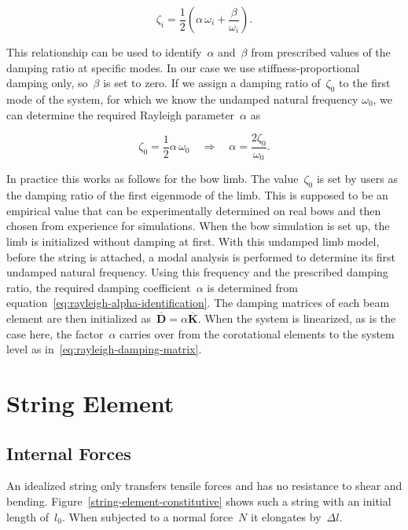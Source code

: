\begin{equation}
\zeta_{i} = \frac{1}{2}\left(\alpha\,\omega_{i} + \frac{\beta}{\omega_{i}}\right).
\end{equation}

This relationship can be used to identify~$\alpha$ and~$\beta$ from prescribed values of the damping ratio at specific modes.
In our case we use stiffness-proportional damping only, so~$\beta$ is set to zero.
If we assign a damping ratio of~$\zeta_{0}$ to the first mode of the system, for which we know the undamped natural frequency $\omega_0$, we can determine the required Rayleigh parameter~$\alpha$ as

\begin{equation}
\zeta_{0} = \frac{1}{2}\alpha\,\omega_{0} \quad \Rightarrow \quad \alpha = \frac{2\zeta_{0}}{\omega_{0}}. \label{eq:rayleigh-alpha-identification}
\end{equation}

In practice this works as follows for the bow limb.
The value~$\zeta_{0}$ is set by users as the damping ratio of the first eigenmode of the limb.
This is supposed to be an empirical value that can be experimentally determined on real bows and then chosen from experience for simulations.
When the bow simulation is set up, the limb is initialized without damping at first.
With this undamped limb model, before the string is attached, a modal analysis is performed to determine its first undamped natural frequency.
Using this frequency and the prescribed damping ratio, the required damping coefficient~$\alpha$ is determined from equation~\eqref{eq:rayleigh-alpha-identification}.
The damping matrices of each beam element are then initialized as~$\overline{\boldsymbol{D}} = \alpha\overline{\boldsymbol{K}}$.
When the system is linearized, as is the case here, the factor~$\alpha$ carries over from the corotational elements to the system level as in~\eqref{eq:rayleigh-damping-matrix}.

\newpage
\section{String Element}

\subsection{Internal Forces}

An idealized string only transfers tensile forces and has no resistance to shear and bending.
Figure~\ref{string-element-constitutive} shows such a string with an initial length of~$l_0$.
When subjected to a normal force~$N$ it elongates by~$\Delta l$.

